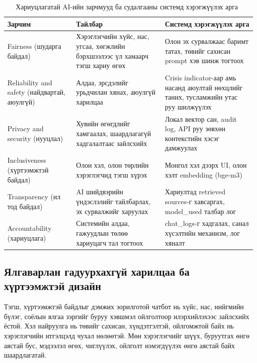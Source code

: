 \begin{table}[H]
\centering
\footnotesize
\renewcommand{\arraystretch}{1.15}
\begin{tabular}{|p{3.0cm}|p{5.0cm}|p{5.8cm}|}
\hline
\textbf{Зарчим} & \textbf{Тайлбар} & \textbf{Системд хэрэгжүүлэх арга} \\ \hline
Fairness (шударга байдал) & Хэрэглэгчийн хүйс, нас, угсаа, хөгжлийн бэрхшээлээс үл хамаарч тэгш хариу өгөх & Олон эх сурвалжаас баримт татах, төвийг сахисан prompt хэв шинж тогтоох \\ \hline
Reliability and safety (найдвартай, аюулгүй) & Алдаа, эрсдэлийг урьдчилан хянах, аюулгүй харилцаа & Crisis indicator-аар амь насанд аюултай нөхцлийг таних, тусламжийн утас руу шилжүүлэх \\ \hline
Privacy and security (нууцлал) & Хувийн өгөгдлийг хамгаалах, шаардлагагүй хадгалалтаас зайлсхийх & Локал вектор сан, audit log, API руу зөвхөн контекстийн хэсэг дамжуулах \\ \hline
Inclusiveness (хүртээмжтэй байдал) & Олон хэл, олон төрлийн хэрэглэгчид тэгш хүрэх & Монгол хэл дээрх UI, олон хэлт embedding (bge-m3) \\ \hline
Transparency (ил тод байдал) & AI шийдвэрийн үндэслэлийг тайлбарлах, эх сурвалжийг харуулах & Хариултад retrieved sources-г хавсаргах, model\_used талбар лог \\ \hline
Accountability (хариуцлага) & Системийн алдаа, гажуудлын төлөө хариуцагч тал тогтоох & chat\_logs-г хадгалах, санал хүсэлтийн механизм, лог хяналт \\ \hline
\end{tabular}
\caption[Хариуцлагатай AI-ийн зарчмууд]{Хариуцлагатай AI-ийн зарчмууд ба судалгааны системд хэрэгжүүлэх арга~\cite{responsible_ai,nist_ai_rmf}}
\label{tab:rai-principles}
\end{table}
\FloatBarrier

\subsection{Ялгаварлан гадуурхахгүй харилцаа ба хүртээмжтэй дизайн}

Тэгш, хүртээмжтэй байдлыг дэмжих зорилготой чатбот нь хүйс, нас, нийгмийн бүлэг, соёлын ялгаа зэргийг буруу хэвшмэл ойлголтоор илэрхийлэхээс зайлсхийх ёстой. Хэл найруулга нь төвийг сахисан, хүндэтгэлтэй, ойлгомжтой байх нь хэрэглэгчийн итгэлцэлд чухал нөлөөтэй. Мөн хэрэглэгчийг шүүх, буруутгах өнгө аястай бус, мэдээлэл өгөх, чиглүүлэх, ойлголт нэмэгдүүлэх өнгө аястай байх шаардлагатай.

